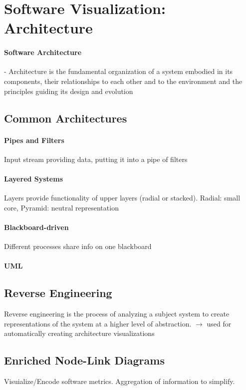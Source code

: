 \documentclass[10pt,a4paper]{article}
\begin{document}
\section{Software Visualization: Architecture}
	\paragraph{Software Architecture} - Architecture is the fundamental organization of a system embodied in its components, their relationships to each other and to the environment and the principles guiding its design and evolution
	
	\subsection{Common Architectures}
		
		\paragraph{Pipes and Filters} Input stream providing data, putting it into a pipe of filters
		
		\paragraph{Layered Systems} Layers provide functionality of upper layers (radial or stacked). Radial: small core, Pyramid: neutral representation 
		
		\paragraph{Blackboard-driven} Different processes share info on one blackboard
		
		\paragraph{UML}
		
	\subsection{Reverse Engineering}
	Reverse engineering is the process of analyzing a subject system to create representations of the system at a higher level of abstraction. $\rightarrow$ used for automatically creating architecture visualizations
	
	\subsection{Enriched Node-Link Diagrams} 
	Visuialize/Encode software metrics. Aggregation of information to simplify.
	
\end{document}
